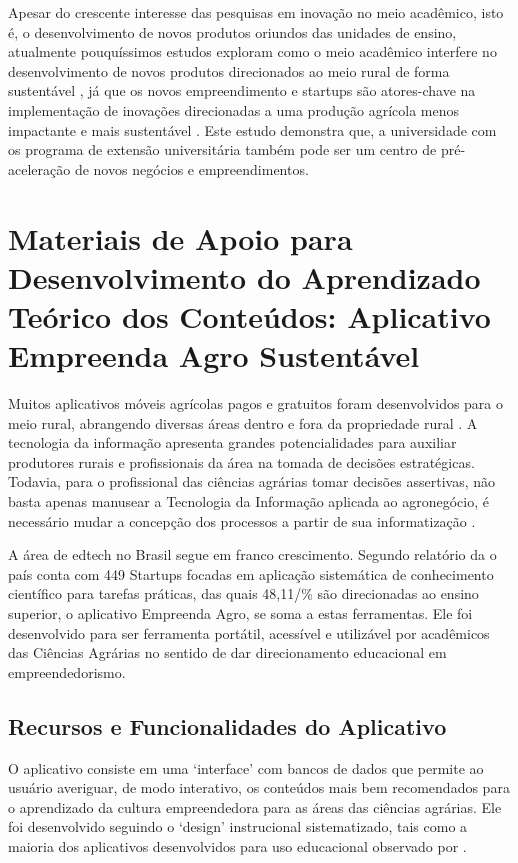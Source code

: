 Apesar do crescente interesse das pesquisas em inovação no meio acadêmico, isto é, o desenvolvimento de novos produtos oriundos das unidades de ensino, atualmente pouquíssimos estudos exploram como o meio acadêmico interfere no desenvolvimento de novos produtos direcionados ao meio rural de forma sustentável \cite{liu_new_2020}, já que os novos empreendimento e startups são atores-chave na implementação de inovações direcionadas a uma produção agrícola menos impactante e mais sustentável \cite{fichter_impacts_2020}. Este estudo demonstra que, a universidade com os programa de extensão universitária também pode ser um centro de pré-aceleração de novos negócios e  empreendimentos. 


\section{Materiais de Apoio para Desenvolvimento do Aprendizado Teórico dos Conteúdos: Aplicativo Empreenda Agro Sustentável}

Muitos aplicativos móveis agrícolas pagos e gratuitos foram desenvolvidos para o meio rural, abrangendo diversas áreas dentro e fora da propriedade rural \cite{silva_environment_2015}. A tecnologia da informação apresenta grandes potencialidades para auxiliar produtores rurais e profissionais da área na tomada de decisões estratégicas. Todavia, para o profissional das ciências agrárias tomar decisões assertivas, não basta apenas manusear a Tecnologia da Informação aplicada ao agronegócio, é necessário mudar a concepção dos processos a partir de sua informatização \cite{ferraz_tecnologia_2017}.

A área de edtech no Brasil segue em franco crescimento. Segundo relatório da  o país conta com 449 Startups focadas em aplicação sistemática de conhecimento científico para tarefas práticas, das quais 48,11/\% são direcionadas ao ensino superior, o aplicativo Empreenda Agro, se soma a estas ferramentas. Ele foi desenvolvido para ser ferramenta portátil, acessível e utilizável por acadêmicos das Ciências Agrárias no sentido de dar direcionamento educacional em empreendedorismo.

\subsection{Recursos e Funcionalidades do Aplicativo}

O aplicativo consiste em uma ‘interface’ com bancos de dados que permite ao usuário averiguar, de modo interativo, os conteúdos mais bem recomendados para o aprendizado da cultura empreendedora para as áreas das ciências agrárias. Ele foi desenvolvido seguindo o ‘design’ instrucional sistematizado, tais como a maioria dos aplicativos desenvolvidos para uso educacional observado por .

